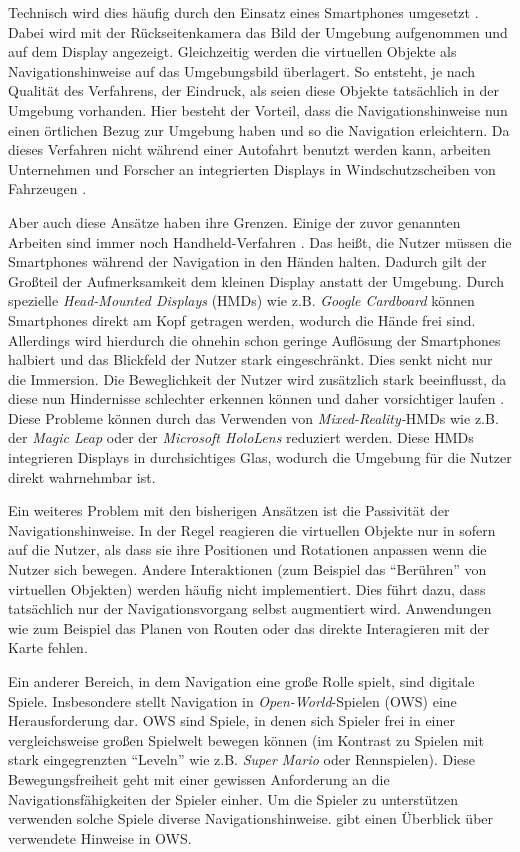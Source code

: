\documentclass[a4paper]{scrartcl}
\begin{document}
Technisch wird dies häufig durch den Einsatz eines Smartphones umgesetzt \autocites{bibid}{bibid}.
Dabei wird mit der Rückseitenkamera das Bild der Umgebung aufgenommen und auf dem Display angezeigt.
Gleichzeitig werden die virtuellen Objekte als Navigationshinweise auf das Umgebungsbild überlagert.
So entsteht, je nach Qualität des Verfahrens, der Eindruck, als seien diese Objekte tatsächlich in der Umgebung vorhanden.
Hier besteht der Vorteil, dass die Navigationshinweise nun einen örtlichen Bezug zur Umgebung haben und so die Navigation erleichtern.
Da dieses Verfahren nicht während einer Autofahrt benutzt werden kann, arbeiten Unternehmen und Forscher an integrierten Displays in Windschutzscheiben von Fahrzeugen \autocites{bibid}{bibid}.

Aber auch diese Ansätze haben ihre Grenzen.
Einige der zuvor genannten Arbeiten sind immer noch Handheld-Verfahren \autocites{bibid}{bibid}.
Das heißt, die Nutzer müssen die Smartphones während der Navigation in den Händen halten.
Dadurch gilt der Großteil der Aufmerksamkeit dem kleinen Display anstatt der Umgebung.
Durch spezielle \emph{Head-Mounted Displays} (HMDs) wie z.B. \emph{Google Cardboard} können Smartphones direkt am Kopf getragen werden, wodurch die Hände frei sind.
Allerdings wird hierdurch die ohnehin schon geringe Auflösung der Smartphones halbiert und das Blickfeld der Nutzer stark eingeschränkt.
Dies senkt nicht nur die Immersion.
Die Beweglichkeit der Nutzer wird zusätzlich stark beeinflusst, da diese nun Hindernisse schlechter erkennen können und daher vorsichtiger laufen \autocite{bibid}.
Diese Probleme können durch das Verwenden von \emph{Mixed-Reality-}HMDs wie z.B. der \emph{Magic Leap} oder der \emph{Microsoft HoloLens} reduziert werden.
Diese HMDs integrieren Displays in durchsichtiges Glas, wodurch die Umgebung für die Nutzer direkt wahrnehmbar ist.

Ein weiteres Problem mit den bisherigen Ansätzen ist die Passivität der Navigationshinweise.
In der Regel reagieren die virtuellen Objekte nur in sofern auf die Nutzer, als dass sie ihre Positionen und Rotationen anpassen wenn die Nutzer sich bewegen.
Andere Interaktionen (zum Beispiel das \enquote{Berühren} von virtuellen Objekten) werden häufig nicht implementiert.
Dies führt dazu, dass tatsächlich nur der Navigationsvorgang selbst augmentiert wird.
Anwendungen wie zum Beispiel das Planen von Routen oder das direkte Interagieren mit der Karte fehlen.

Ein anderer Bereich, in dem Navigation eine große Rolle spielt, sind digitale Spiele.
Insbesondere stellt Navigation in \emph{Open-World}-Spielen (OWS) eine Herausforderung dar.
OWS sind Spiele, in denen sich Spieler frei in einer vergleichsweise großen Spielwelt bewegen können (im Kontrast zu Spielen mit stark eingegrenzten \enquote{Leveln} wie z.B. \emph{Super Mario} oder Rennspielen).
Diese Bewegungsfreiheit geht mit einer gewissen Anforderung an die Navigationsfähigkeiten der Spieler einher.
Um die Spieler zu unterstützen verwenden solche Spiele diverse Navigationshinweise.
\textcite{Lodts2015} gibt einen Überblick über verwendete Hinweise in OWS.
\end{document}
